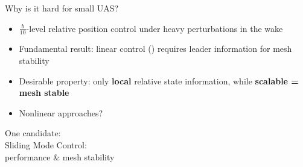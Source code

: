 \documentclass[]{beamer}
\begin{document}
\usebackgroundtemplate{}


\begin{frame}{Why is it hard for small UAS?}
\centering
\vspace{-6em}
\begin{tcolorbox}[width=.99\textwidth,
colback={gray!10!},
standard jigsaw,
opacityback=1,  %
]  
\begin{itemize}
\item $\frac{b}{10}$-level relative position control under heavy perturbations in the wake 
\item Fundamental result: linear control (\cite{shaw2007controller}) requires leader information for mesh stability \cite{Seiler2004}
\item Desirable property: only \textbf{local} relative state information, while \textbf{scalable = mesh stable}
\item Nonlinear approaches?
\end{itemize}
\end{tcolorbox}
\end{frame}

\usebackgroundtemplate{}
\begin{frame}
\centering
\Large
\vspace{3em}
\begin{center}
One candidate: \\
Sliding Mode Control:\\
performance \& mesh stability
\end{center}
\end{frame}
\end{document}
